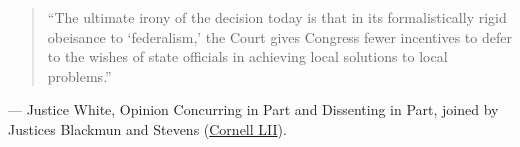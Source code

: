 \documentclass[12pt]{article}
\begin{document}
\begin{quote}
``The ultimate irony of the decision today is that in its formalistically rigid obeisance to `federalism,' the Court gives Congress fewer incentives to defer to the wishes of state officials in achieving local solutions to local problems.''
\end{quote}
\noindent --- Justice White, Opinion Concurring in Part and Dissenting in Part, joined by Justices Blackmun and Stevens (\href{https://www.law.cornell.edu/supremecourt/text/505/144}{Cornell LII}).
\end{document}
